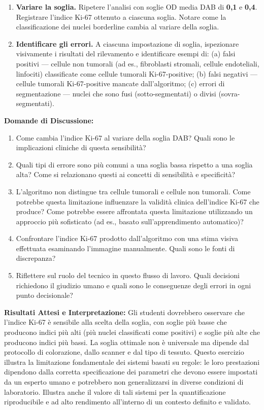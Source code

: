 \begin{enumerate}
    \item \textbf{Variare la soglia.} Ripetere l'analisi con soglie OD media DAB di \textbf{0,1} e \textbf{0,4}. Registrare l'indice Ki-67 ottenuto a ciascuna soglia. Notare come la classificazione dei nuclei borderline cambia al variare della soglia.

    \item \textbf{Identificare gli errori.} A ciascuna impostazione di soglia, ispezionare visivamente i risultati del rilevamento e identificare esempi di: (a) falsi positivi — cellule non tumorali (ad es., fibroblasti stromali, cellule endoteliali, linfociti) classificate come cellule tumorali Ki-67-positive; (b) falsi negativi — cellule tumorali Ki-67-positive mancate dall'algoritmo; (c) errori di segmentazione — nuclei che sono fusi (sotto-segmentati) o divisi (sovra-segmentati).
\end{enumerate}

\textbf{Domande di Discussione:}
\begin{enumerate}
    \item Come cambia l'indice Ki-67 al variare della soglia DAB? Quali sono le implicazioni cliniche di questa sensibilità?
    \item Quali tipi di errore sono più comuni a una soglia bassa rispetto a una soglia alta? Come si relazionano questi ai concetti di sensibilità e specificità?
    \item L'algoritmo non distingue tra cellule tumorali e cellule non tumorali. Come potrebbe questa limitazione influenzare la validità clinica dell'indice Ki-67 che produce? Come potrebbe essere affrontata questa limitazione utilizzando un approccio più sofisticato (ad es., basato sull'apprendimento automatico)?
    \item Confrontare l'indice Ki-67 prodotto dall'algoritmo con una stima visiva effettuata esaminando l'immagine manualmente. Quali sono le fonti di discrepanza?
    \item Riflettere sul ruolo del tecnico in questo flusso di lavoro. Quali decisioni richiedono il giudizio umano e quali sono le conseguenze degli errori in ogni punto decisionale?
\end{enumerate}

\textbf{Risultati Attesi e Interpretazione:} Gli studenti dovrebbero osservare che l'indice Ki-67 è sensibile alla scelta della soglia, con soglie più basse che producono indici più alti (più nuclei classificati come positivi) e soglie più alte che producono indici più bassi. La soglia ottimale non è universale ma dipende dal protocollo di colorazione, dallo scanner e dal tipo di tessuto. Questo esercizio illustra la limitazione fondamentale dei sistemi basati su regole: le loro prestazioni dipendono dalla corretta specificazione dei parametri che devono essere impostati da un esperto umano e potrebbero non generalizzarsi in diverse condizioni di laboratorio. Illustra anche il valore di tali sistemi per la quantificazione riproducibile e ad alto rendimento all'interno di un contesto definito e validato.

